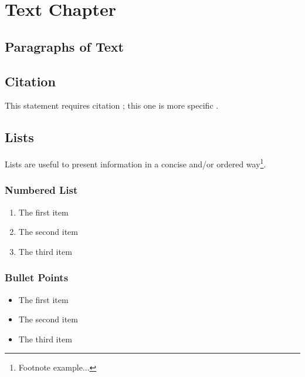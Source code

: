 
\chapter{Text Chapter}

\section{Paragraphs of Text}

\lipsum[1-7] %


\section{Citation}

This statement requires citation \cite{book_key}; this one is more specific \cite[122]{article_key}.


\section{Lists}

Lists are useful to present information in a concise and/or ordered way\footnote{Footnote example...}.

\subsection{Numbered List}

\begin{enumerate}
\item The first item
\item The second item
\item The third item
\end{enumerate}

\subsection{Bullet Points}

\begin{itemize}
\item The first item
\item The second item
\item The third item
\end{itemize}


